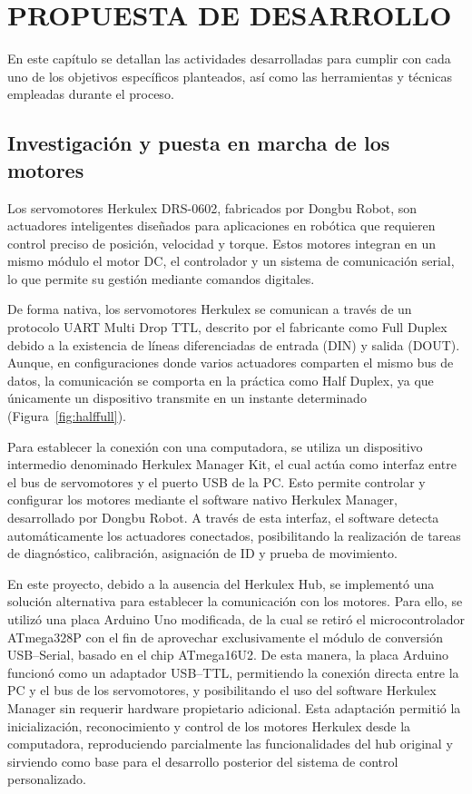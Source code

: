 
\chapter{PROPUESTA DE DESARROLLO}

En este capítulo se detallan las actividades desarrolladas para cumplir con cada uno de los objetivos específicos planteados, así como las herramientas y técnicas empleadas durante el proceso.

\section{Investigación y puesta en marcha de los motores}

Los servomotores Herkulex DRS-0602, fabricados por Dongbu Robot, son actuadores inteligentes diseñados para aplicaciones en robótica que requieren control preciso de posición, velocidad y torque. Estos motores integran en un mismo módulo el motor DC, el controlador y un sistema de comunicación serial, lo que permite su gestión mediante comandos digitales.

De forma nativa, los servomotores Herkulex se comunican a través de un protocolo UART Multi Drop TTL, descrito por el fabricante como Full Duplex debido a la existencia de líneas diferenciadas de entrada (DIN) y salida (DOUT). Aunque, en configuraciones donde varios actuadores comparten el mismo bus de datos, la comunicación se comporta en la práctica como Half Duplex, ya que únicamente un dispositivo transmite en un instante determinado (Figura~\ref{fig:halffull}).

Para establecer la conexión con una computadora, se utiliza un dispositivo intermedio denominado Herkulex Manager Kit, el cual actúa como interfaz entre el bus de servomotores y el puerto USB de la PC. Esto permite controlar y configurar los motores mediante el software nativo Herkulex Manager, desarrollado por Dongbu Robot. A través de esta interfaz, el software detecta automáticamente los actuadores conectados, posibilitando la realización de tareas de diagnóstico, calibración, asignación de ID y prueba de movimiento.

En este proyecto, debido a la ausencia del Herkulex Hub, se implementó una solución alternativa para establecer la comunicación con los motores. Para ello, se utilizó una placa Arduino Uno modificada, de la cual se retiró el microcontrolador ATmega328P con el fin de aprovechar exclusivamente el módulo de conversión USB--Serial, basado en el chip ATmega16U2. De esta manera, la placa Arduino funcionó como un adaptador USB--TTL, permitiendo la conexión directa entre la PC y el bus de los servomotores, y posibilitando el uso del software Herkulex Manager sin requerir hardware propietario adicional. Esta adaptación permitió la inicialización, reconocimiento y control de los motores Herkulex desde la computadora, reproduciendo parcialmente las funcionalidades del hub original y sirviendo como base para el desarrollo posterior del sistema de control personalizado.

